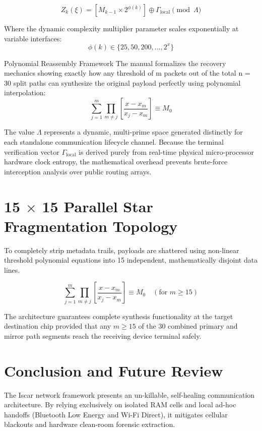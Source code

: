 \documentclass[10pt,journal,compsoc]{IEEEtran}
\begin{document}
\begin{equation}
Z_k(\xi) = [M_{k-1} \times 2^{\phi(k)}] \oplus \Gamma_{\text{local}} \pmod{\Lambda}
\end{equation}

Where the dynamic complexity multiplier parameter scales exponentially at variable interfaces:
\begin{equation}
\phi(k) \in \{25, 50, 200, \dots, 2^x\}
\end{equation}

\Lagrange Polynomial Reassembly Framework
The manual formalizes the recovery mechanics showing exactly how any threshold of m  packets out of the total n = 30 split paths can synthesize the original payload perfectly using polynomial interpolation:
\begin{equation}
\sum_{j=1}^{m} \prod_{m \neq j} \left[ \frac{x - x_m}{x_j - x_m} \right] \equiv M_0
\end{equation}

The value $\Lambda$ represents a dynamic, multi-prime space generated distinctly for each standalone communication lifecycle channel. Because the terminal verification vector $\Gamma_{\text{local}}$ is derived purely from real-time physical micro-processor hardware clock entropy, the mathematical overhead prevents brute-force interception analysis over public routing arrays.

\section{15 $\times$ 15 Parallel Star Fragmentation Topology}
To completely strip metadata trails, payloads are shattered using non-linear threshold polynomial equations into 15 independent, mathematically disjoint data lines.

\begin{equation}
\sum_{j=1}^{m} \prod_{m \neq j} \left[ \frac{x - x_m}{x_j - x_m} \right] \equiv M_0 \quad (\text{for } m \ge 15)
\end{equation}

The architecture guarantees complete synthesis functionality at the target destination chip provided that any $m \ge 15$ of the 30 combined primary and mirror path segments reach the receiving device terminal safely.

\section{Conclusion and Future Review}
The Iscar network framework presents an un-killable, self-healing communication architecture. By relying exclusively on isolated RAM cells and local ad-hoc handoffs (Bluetooth Low Energy and Wi-Fi Direct), it mitigates cellular blackouts and hardware clean-room forensic extraction.


\end{document}
